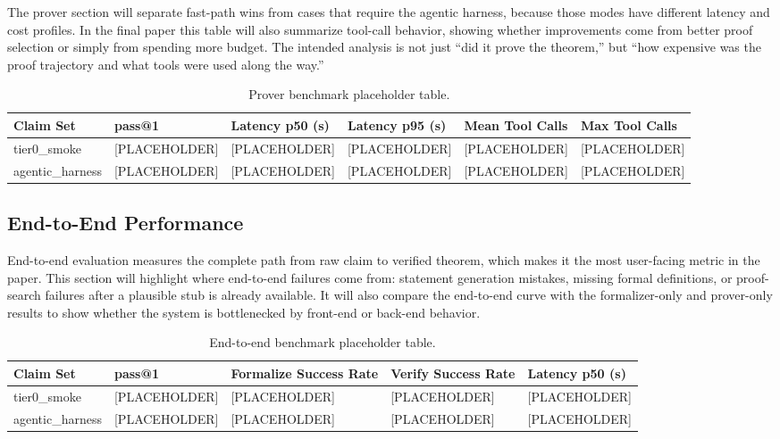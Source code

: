 \documentclass[11pt,letterpaper]{article}
\begin{document}
The prover section will separate fast-path wins from cases that require the agentic harness, because those modes have different latency and cost profiles. In the final paper this table will also summarize tool-call behavior, showing whether improvements come from better proof selection or simply from spending more budget. The intended analysis is not just ``did it prove the theorem,'' but ``how expensive was the proof trajectory and what tools were used along the way.'' 

\begin{table}[h]
\centering
\begin{tabular}{llllll}
\toprule
Claim Set & pass@1 & Latency p50 (s) & Latency p95 (s) & Mean Tool Calls & Max Tool Calls \\
\midrule
tier0\_smoke & [PLACEHOLDER] & [PLACEHOLDER] & [PLACEHOLDER] & [PLACEHOLDER] & [PLACEHOLDER] \\
agentic\_harness & [PLACEHOLDER] & [PLACEHOLDER] & [PLACEHOLDER] & [PLACEHOLDER] & [PLACEHOLDER] \\
\bottomrule
\end{tabular}
\caption{Prover benchmark placeholder table.}
\end{table}

\subsection{End-to-End Performance}

End-to-end evaluation measures the complete path from raw claim to verified theorem, which makes it the most user-facing metric in the paper. This section will highlight where end-to-end failures come from: statement generation mistakes, missing formal definitions, or proof-search failures after a plausible stub is already available. It will also compare the end-to-end curve with the formalizer-only and prover-only results to show whether the system is bottlenecked by front-end or back-end behavior.

\begin{table}[h]
\centering
\begin{tabular}{lllll}
\toprule
Claim Set & pass@1 & Formalize Success Rate & Verify Success Rate & Latency p50 (s) \\
\midrule
tier0\_smoke & [PLACEHOLDER] & [PLACEHOLDER] & [PLACEHOLDER] & [PLACEHOLDER] \\
agentic\_harness & [PLACEHOLDER] & [PLACEHOLDER] & [PLACEHOLDER] & [PLACEHOLDER] \\
\bottomrule
\end{tabular}
\caption{End-to-end benchmark placeholder table.}
\end{table}
\end{document}
